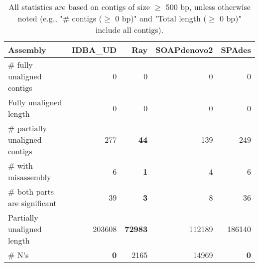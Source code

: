 \documentclass[12pt,a4paper]{article}
\begin{document}
\begin{table}[ht]
\begin{center}
\caption{All statistics are based on contigs of size $\geq$ 500 bp, unless otherwise noted (e.g., "\# contigs ($\geq$ 0 bp)" and "Total length ($\geq$ 0 bp)" include all contigs).}
\begin{tabular}{|l*{4}{|r}|}
\hline
Assembly & IDBA\_UD & Ray & SOAPdenovo2 & SPAdes \\ \hline
\# fully unaligned contigs & 0 & 0 & 0 & 0 \\ \hline
Fully unaligned length & 0 & 0 & 0 & 0 \\ \hline
\# partially unaligned contigs & 277 & {\bf 44} & 139 & 249 \\ \hline
\hspace{5mm}\# with misassembly & 6 & {\bf 1} & 4 & 6 \\ \hline
\hspace{5mm}\# both parts are significant & 39 & {\bf 3} & 8 & 36 \\ \hline
Partially unaligned length & 203608 & {\bf 72983} & 112189 & 186140 \\ \hline
\# N's & {\bf 0} & 2165 & 14969 & {\bf 0} \\ \hline
\end{tabular}
\end{center}
\end{table}
\end{document}

